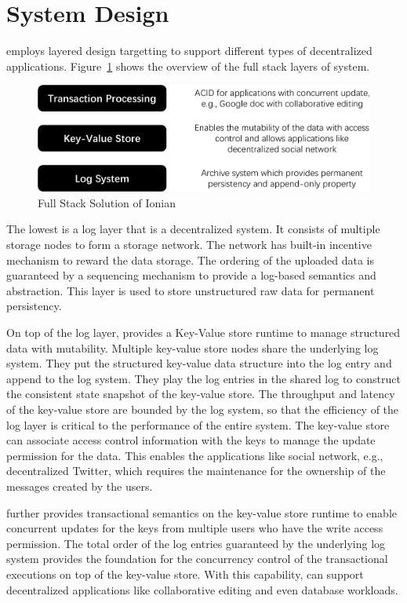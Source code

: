 \section{System Design}

\project employs layered design targetting to support different types of decentralized applications. Figure~\ref{fig:stack} shows the overview of the full stack layers of \project system. 

\begin{figure}[H]	
	\includegraphics[width=\textwidth]{figure/stack-crop.pdf}
	\caption{Full Stack Solution of Ionian}
	\label{fig:stack}
\end{figure}

The lowest is a log layer that is a decentralized system. It consists of multiple storage nodes to form a storage network. The network has built-in incentive mechanism to reward the data storage. The ordering of the uploaded data is guaranteed by a sequencing mechanism to provide a log-based semantics and abstraction. This layer is used to store unstructured raw data for permanent persistency.

On top of the log layer, \project provides a Key-Value store runtime to manage structured data with mutability. Multiple key-value store nodes share the underlying log system. They put the structured key-value data structure into the log entry and append to the log system. They play the log entries in the shared log to construct the consistent state snapshot of the key-value store. The throughput and latency of the key-value store are bounded by the log system, so that the efficiency of the log layer is critical to the performance of the entire system. The key-value store can associate access control information with the keys to manage the update permission for the data. This enables the applications like social network, e.g., decentralized Twitter, which requires the maintenance for the ownership of the messages created by the users. 

\project further provides transactional semantics on the key-value store runtime to enable concurrent updates for the keys from multiple users who have the write access permission. The total order of the log entries guaranteed by the underlying log system provides the foundation for the concurrency control of the transactional executions on top of the key-value store. With this capability, \project can support decentralized applications like collaborative editing and even database workloads.    
